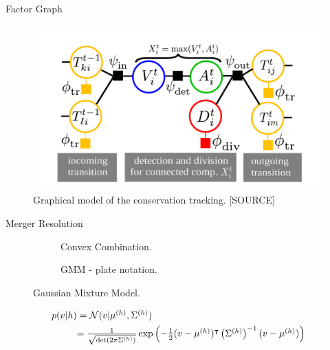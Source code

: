 \begin{frame}{Factor Graph}
    \begin{figure}
        \centering
        \includegraphics[width=\textwidth]{images/conservation/factor_graph.png}
        \caption{Graphical model of the conservation tracking. [SOURCE]}
        \label{fig:conservation-fg}
    \end{figure}
\end{frame}

\begin{frame}{Merger Resolution}
    \begin{figure}
        \centering
        \begin{subfigure}[b]{0.44\textwidth}
            \centering
            \scalebox{0.65}{
                
            }
            \caption{Convex Combination.}
        \end{subfigure}
        \hfill
        \begin{subfigure}[b]{0.44\textwidth}
            \centering
            \scalebox{0.74}{
                
            }
            \caption{GMM - plate notation.}
        \end{subfigure}
        \caption{Gaussian Mixture Model.}
        \label{fig:conservation-gmm}
    \end{figure}
    \begin{align*}
        \label{eq:gmm-normal}
        \mathsmaller{p(v|h)} &= \mathsmaller{\mathcal{N}({v}|\MUH , \SIGMAH )} \\ 
        &\mathsmaller{= \frac{1}{\sqrt{\det(2\pi\SIGMAH )} }\exp\left(-\frac{1}{2}({v}-\MUH )^\intercal
            \left(\SIGMAH\right) ^{-1} ({v}-\MUH )\right)}
    \end{align*}
\end{frame}

